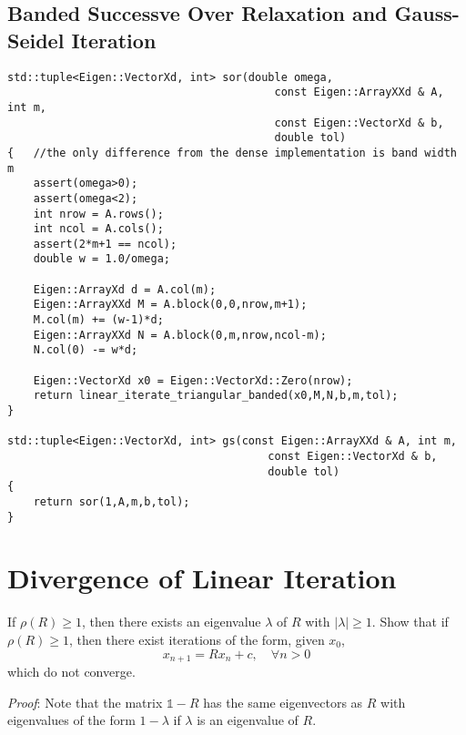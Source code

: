 \documentclass[paper=a4, fontsize=11pt]{scrartcl} %
\numberwithin{equation}{section} %
\numberwithin{figure}{section} %
\numberwithin{table}{section} %
\begin{document}
\subsection{Banded Successve Over Relaxation and Gauss-Seidel Iteration}
\begin{lstlisting}
std::tuple<Eigen::VectorXd, int> sor(double omega,
                                         const Eigen::ArrayXXd & A, int m, 
                                         const Eigen::VectorXd & b, 
                                         double tol)
{   //the only difference from the dense implementation is band width m
    assert(omega>0);
    assert(omega<2);
    int nrow = A.rows();
    int ncol = A.cols();
    assert(2*m+1 == ncol);
    double w = 1.0/omega;

    Eigen::ArrayXd d = A.col(m);
    Eigen::ArrayXXd M = A.block(0,0,nrow,m+1);
    M.col(m) += (w-1)*d;
    Eigen::ArrayXXd N = A.block(0,m,nrow,ncol-m);
    N.col(0) -= w*d;
    
    Eigen::VectorXd x0 = Eigen::VectorXd::Zero(nrow);
    return linear_iterate_triangular_banded(x0,M,N,b,m,tol);
}

std::tuple<Eigen::VectorXd, int> gs(const Eigen::ArrayXXd & A, int m,
                                        const Eigen::VectorXd & b,
                                        double tol)
{
    return sor(1,A,m,b,tol);
}
\end{lstlisting}

\newpage
\section{Divergence of Linear Iteration}
If $\rho(R)\ge 1$, then there exists an eigenvalue $\lambda$ of $R$ with $|\lambda|\ge 1$.
Show that if $\rho(R)\ge 1$, then there exist iterations of the form, given $x_0$,
$$
x_{n+1} = Rx_n + c, \quad \forall n>0
$$
which do not converge.

\textit{Proof}: Note that the matrix $\mathbb{1}-R$ has
the same eigenvectors as $R$ with eigenvalues of the form $1-\lambda$ if $\lambda$ is an eigenvalue of $R$.
\end{document}

